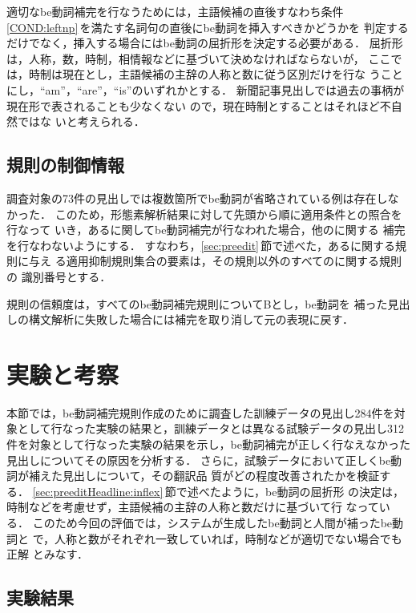 適切なbe動詞補完を行なうためには，主語候補の直後すなわち条件
\ref{COND:leftnp}\,を満たす名詞句の直後にbe動詞を挿入すべきかどうかを
判定するだけでなく，挿入する場合にはbe動詞の屈折形を決定する必要がある．
屈折形は，人称，数，時制，相情報などに基づいて決めなければならないが，
ここでは，時制は現在とし，主語候補の主辞の人称と数に従う区別だけを行な
うことにし，``am''，``are''，``is''のいずれかとする．
新聞記事見出しでは過去の事柄が現在形で表されることも少なくない
\cite{Shirai97,Uenoda78}ので，現在時制とすることはそれほど不自然ではな
いと考えられる．

\subsection{規則の制御情報}
\label{sec:preeditHeadline:ctrl}

調査対象の73件の見出しでは複数箇所でbe動詞が省略されている例は存在しな
かった．
このため，形態素解析結果に対して先頭から順に適用条件との照合を行なって
いき，ある\KEYC に関してbe動詞補完が行なわれた場合，他の\KEYC に関する
補完を行なわないようにする．
すなわち，\ref{sec:preedit}\,節で述べた，ある\KEYC に関する規則に与え
る適用抑制規則集合の要素は，その規則以外のすべての\KEYC に関する規則の
識別番号とする．

規則の信頼度は，すべてのbe動詞補完規則についてBとし，be動詞を
補った見出しの構文解析に失敗した場合には補完を取り消して元の表現に戻す．

\section{実験と考察}
\label{sec:experiment}

本節では，be動詞補完規則作成のために調査した訓練データの見出し284件を対
象として行なった実験の結果と，訓練データとは異なる試験データの見出し312
件を対象として行なった実験の結果を示し，be動詞補完が正しく行なえなかった
見出しについてその原因を分析する．
さらに，試験データにおいて正しくbe動詞が補えた見出しについて，その翻訳品
質がどの程度改善されたかを検証する．
\ref{sec:preeditHeadline:inflex}\,節で述べたように，be動詞の屈折形
の決定は，時制などを考慮せず，主語候補の主辞の人称と数だけに基づいて行
なっている．
このため今回の評価では，システムが生成したbe動詞と人間が補ったbe動詞と
で，人称と数がそれぞれ一致していれば，時制などが適切でない場合でも正解
とみなす．

\subsection{実験結果}

